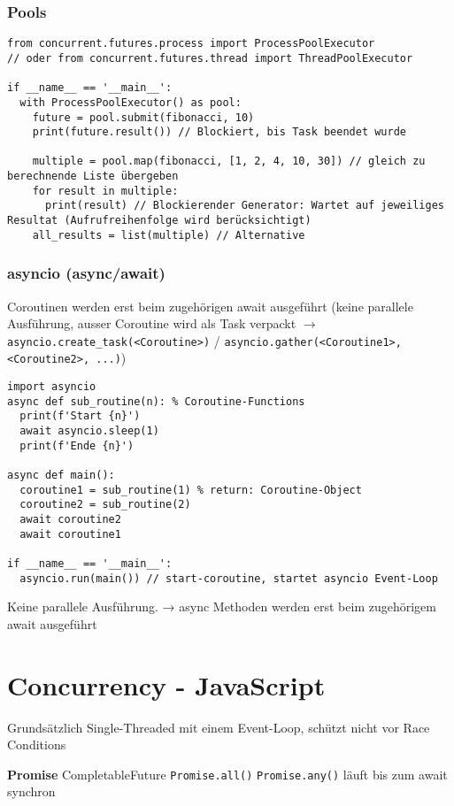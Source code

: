 \subsubsection{Pools}

\begin{lstlisting}
from concurrent.futures.process import ProcessPoolExecutor
// oder from concurrent.futures.thread import ThreadPoolExecutor

if __name__ == '__main__':
  with ProcessPoolExecutor() as pool:
  	future = pool.submit(fibonacci, 10)
  	print(future.result()) // Blockiert, bis Task beendet wurde

  	multiple = pool.map(fibonacci, [1, 2, 4, 10, 30]) // gleich zu berechnende Liste übergeben
  	for result in multiple:
  	  print(result) // Blockierender Generator: Wartet auf jeweiliges Resultat (Aufrufreihenfolge wird berücksichtigt)
    all_results = list(multiple) // Alternative
\end{lstlisting}

\subsubsection{asyncio (async/await)}

Coroutinen werden erst beim zugehörigen await ausgeführt (keine parallele Ausführung, ausser Coroutine wird als Task verpackt $\rightarrow$ \lstinline{asyncio.create_task(<Coroutine>)} / \lstinline{asyncio.gather(<Coroutine1>, <Coroutine2>, ...)})

\begin{lstlisting}
import asyncio
async def sub_routine(n): % Coroutine-Functions
  print(f'Start {n}')
  await asyncio.sleep(1)
  print(f'Ende {n}')

async def main():
  coroutine1 = sub_routine(1) % return: Coroutine-Object
  coroutine2 = sub_routine(2)
  await coroutine2
  await coroutine1

if __name__ == '__main__':
  asyncio.run(main()) // start-coroutine, startet asyncio Event-Loop
\end{lstlisting}
Keine parallele Ausführung. → async
Methoden werden erst beim zugehörigem await ausgeführt


\section{Concurrency - JavaScript}
Grundsätzlich Single-Threaded mit einem Event-Loop, schützt nicht vor Race Conditions

\textbf{Promise} CompletableFuture \lstinline{Promise.all()} \lstinline{Promise.any()} läuft bis zum await synchron

